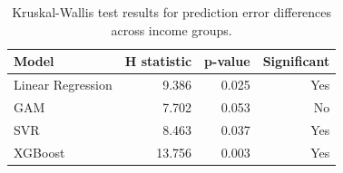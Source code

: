 \begin{table}[htbp]
    \centering
    \small
    \caption{Kruskal-Wallis test results for prediction error differences across income groups.}
    \label{tab:sq2_kruskal_wallis}
    \begin{tabular}{lrrr}
        \toprule
        Model & H statistic & p-value & Significant \\
        \midrule
        Linear Regression & 9.386 & 0.025 & Yes \\
        GAM & 7.702 & 0.053 & No \\
        SVR & 8.463 & 0.037 & Yes \\
        XGBoost & 13.756 & 0.003 & Yes \\
        \bottomrule
    \end{tabular}
\end{table}
